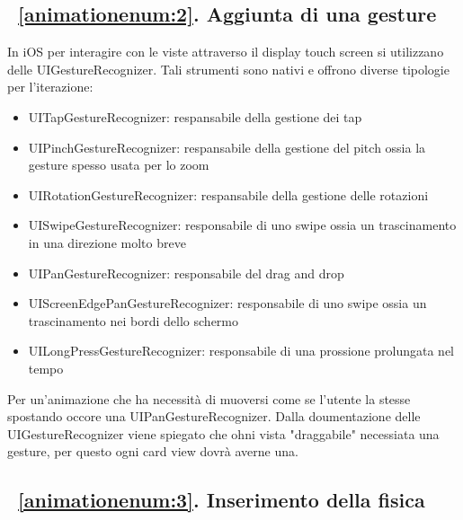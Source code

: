\subsection{~\ref{animationenum:2}. Aggiunta di una gesture}

In iOS per interagire con le viste attraverso il display touch screen si utilizzano delle UIGestureRecognizer.
Tali strumenti sono nativi e offrono diverse tipologie per l'iterazione:
\begin{itemize}
    \item UITapGestureRecognizer: respansabile della gestione dei tap

    \item UIPinchGestureRecognizer: respansabile della gestione del pitch ossia la gesture spesso usata per lo zoom
    
    \item UIRotationGestureRecognizer: respansabile della gestione delle rotazioni
    
    \item UISwipeGestureRecognizer: responsabile di uno swipe ossia un trascinamento in una direzione molto breve
    
    \item UIPanGestureRecognizer: responsabile del drag and drop
    
    \item UIScreenEdgePanGestureRecognizer: responsabile di uno swipe ossia un trascinamento nei bordi dello schermo
    
    \item UILongPressGestureRecognizer: responsabile di una prossione prolungata nel tempo
\end{itemize}

Per un'animazione che ha necessità di muoversi come se l'utente la stesse spostando occore una UIPanGestureRecognizer.
Dalla doumentazione delle UIGestureRecognizer viene spiegato che ohni vista "draggabile" necessiata una gesture,
per questo ogni card view dovrà averne una.

\subsection{~\ref{animationenum:3}. Inserimento della fisica}

